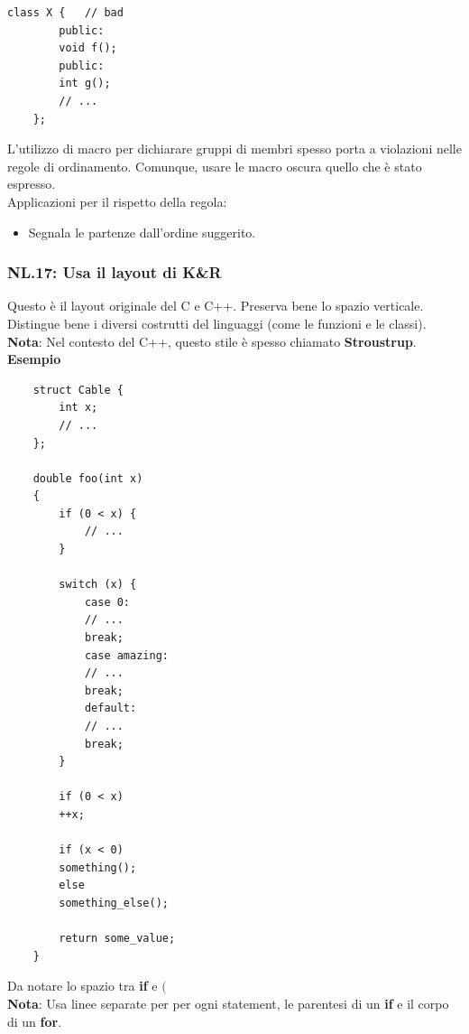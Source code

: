 \begin{lstlisting}[frame=single, rulecolor=\color{red}]
	class X {   // bad
		public:
		void f();
		public:
		int g();
		// ...
	};
\end{lstlisting}

\textsf{\small L'utilizzo di macro per dichiarare gruppi di membri spesso porta a violazioni nelle regole di ordinamento. Comunque, usare le macro oscura quello che è stato espresso. } \\

\textsf{\small Applicazioni per il rispetto della regola: } 

\begin{itemize}
	\item \textsf{\small Segnala le partenze dall'ordine suggerito.}
\end{itemize}

\subsubsection{NL.17: Usa il layout di K\&R }

\textsf{\small Questo è il layout originale del C e C++. Preserva bene lo spazio verticale. Distingue bene i diversi costrutti del linguaggi (come le funzioni e le classi).} \\

\textsf{\small \textbf{Nota}: Nel contesto del C++, questo stile è spesso chiamato \textbf{Stroustrup}.} \\

\textsf{\small \textbf{Esempio}}

\begin{lstlisting}
	struct Cable {
		int x;
		// ...
	};
	
	double foo(int x)
	{
		if (0 < x) {
			// ...
		}
		
		switch (x) {
			case 0:
			// ...
			break;
			case amazing:
			// ...
			break;
			default:
			// ...
			break;
		}
		
		if (0 < x)
		++x;
		
		if (x < 0)
		something();
		else
		something_else();
		
		return some_value;
	}
\end{lstlisting}

\textsf{\small Da notare lo spazio tra \textbf{if} e \textbf{$($}} \\

\textsf{\small \textbf{Nota}: Usa linee separate per per ogni statement, le parentesi di un \textbf{if} e il corpo di un \textbf{for}.} \\

